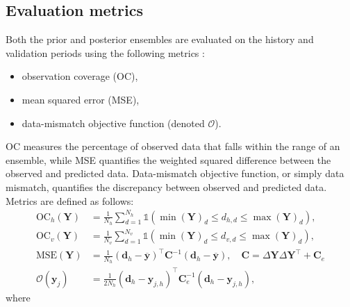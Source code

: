 \subsection{Evaluation metrics}
\label{subsec:evaluation-metrics}
Both the prior and posterior ensembles are evaluated on the history and validation periods using the following metrics
\cite[sections 9.4.2 and 9.4.4]{Emerick:2025}:
\begin{itemize}
    \item observation coverage (OC),
    \item mean squared error (MSE),
    \item data-mismatch objective function (denoted $\mathcal{O}$).
\end{itemize}
%
OC measures the percentage of observed data that falls within the range of an ensemble,
while MSE quantifies the weighted squared difference between the observed and predicted data.
Data-mismatch objective function, or simply data mismatch, quantifies the discrepancy between observed and predicted data.
Metrics are defined as follows:
%
\begin{align}
    \text{OC}_h(\mathbf{Y}) &= \frac{1}{N_h} \sum_{d=1}^{N_h} 
    \mathbb{1}\left(
        \min(\mathbf{Y})_d \leq d_{h, d} \leq \max(\mathbf{Y})_d
    \right),\\
    \text{OC}_v(\mathbf{Y}) &= \frac{1}{N_v} \sum_{d=1}^{N_v} 
    \mathbb{1}\left(
        \min(\mathbf{Y})_d \leq d_{v, d} \leq \max(\mathbf{Y})_d
    \right),\\
    \text{MSE}(\mathbf{Y}) &= 
    \frac{1}{N_h} 
    (\mathbf{d}_h - \overline{\mathbf{y}})^\top \mathbf{C}^{-1} 
    (\mathbf{d}_h - \overline{\mathbf{y}}),
    \quad 
    \mathbf{C} = \Delta\mathbf{Y}\Delta\mathbf{Y}^\top + \mathbf{C}_e \\
    \mathcal{O}(\mathbf{y}_j) &= 
    \frac{1}{2N_h}
    (\mathbf{d}_h - \mathbf{y}_{j, h})^\top
    \mathbf{C}_e^{-1}
    (\mathbf{d}_h - \mathbf{y}_{j, h}),
\end{align}
%
where 
%
